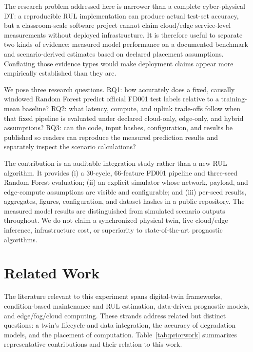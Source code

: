 ﻿\documentclass[conference]{IEEEtran}
\begin{document}
The research problem addressed here is narrower than a complete cyber-physical DT: a reproducible RUL implementation can produce actual test-set accuracy, but a classroom-scale software project cannot claim cloud/edge service-level measurements without deployed infrastructure. It is therefore useful to separate two kinds of evidence: measured model performance on a documented benchmark and scenario-derived estimates based on declared placement assumptions. Conflating those evidence types would make deployment claims appear more empirically established than they are.

We pose three research questions. RQ1: how accurately does a fixed, causally windowed Random Forest predict official FD001 test labels relative to a training-mean baseline? RQ2: what latency, compute, and uplink trade-offs follow when that fixed pipeline is evaluated under declared cloud-only, edge-only, and hybrid assumptions? RQ3: can the code, input hashes, configuration, and results be published so readers can reproduce the measured prediction results and separately inspect the scenario calculations?

The contribution is an auditable integration study rather than a new RUL algorithm. It provides (i) a 30-cycle, 66-feature FD001 pipeline and three-seed Random Forest evaluation; (ii) an explicit simulator whose network, payload, and edge-compute assumptions are visible and configurable; and (iii) per-seed results, aggregates, figures, configuration, and dataset hashes in a public repository. The measured model results are distinguished from simulated scenario outputs throughout. We do not claim a synchronized physical twin, live cloud/edge inference, infrastructure cost, or superiority to state-of-the-art prognostic algorithms.

\section{Related Work}
The literature relevant to this experiment spans digital-twin frameworks, condition-based maintenance and RUL estimation, data-driven prognostic models, and edge/fog/cloud computing. These strands address related but distinct questions: a twin's lifecycle and data integration, the accuracy of degradation models, and the placement of computation. Table~\ref{tab:priorwork} summarizes representative contributions and their relation to this work.
\end{document}
